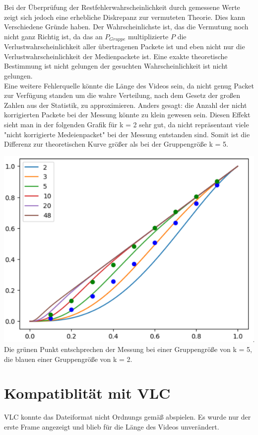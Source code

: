 \documentclass{article}
\begin{document}
        Bei der Überprüfung der Restfehlerwahrscheinlichkeit durch gemessene Werte zeigt sich jedoch eine erhebliche Diskrepanz zur vermuteten Theorie.
        Dies kann Verschiedene Gründe haben.
        Der Wahrscheinlichste ist, das die Vermutung noch nicht ganz Richtig ist, da das an $P_{Gruppe}$ multiplizierte $P$ die Verlustwahrscheinlichkeit aller übertragenen Packete ist und eben nicht nur die Verlustwahrscheinlichkeit
        der Medienpackete ist. Eine exakte theoretische Bestimmung ist nicht gelungen der gesuchten Wahrscheinlichkeit ist nicht gelungen.
        \\
        Eine weitere Fehlerquelle könnte die Länge des Videos sein, da nicht genug Packet zur Verfügung standen um die wahre Verteilung, nach dem Gesetz der großen Zahlen aus der Statistik, zu approximieren.
        Anders gesagt: die Anzahl der nicht korrigierten Packete bei der Messung könnte zu klein gewesen sein.
        Diesen Effekt sieht man in der folgenden Grafik für k = 2 sehr gut, da nicht repräsentant viele "nicht korrigierte Medeienpacket" bei der Messung entstanden sind.
        Somit ist die Differenz zur theoretischen Kurve größer als bei der Gruppengröße k = 5.

        \includegraphics[width=1\textwidth,scale=0.5]{11-01-2023-23:03:16.png}
        Die grünen Punkt entschprechen der Messung bei einer Gruppengröße von k = 5, die blauen einer Gruppengröße von k = 2.

    \section{Kompatiblität mit VLC}
        VLC konnte das Dateiformat nicht Ordnungs gemäß abspielen. Es wurde nur der erste Frame angezeigt und blieb für die Länge des Videos unverändert.
\end{document}
